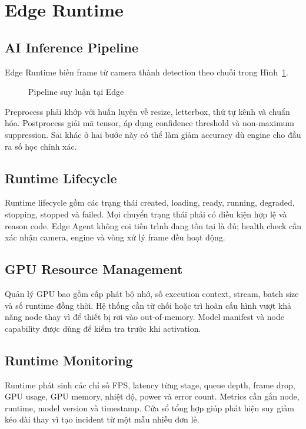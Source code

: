 \section{Edge Runtime}

\subsection{AI Inference Pipeline}

Edge Runtime biến frame từ camera thành detection theo chuỗi trong
Hình~\ref{fig:inference-pipeline-theory}.

\begin{figure}[H]
\centering
{}
\caption{Pipeline suy luận tại Edge}
\label{fig:inference-pipeline-theory}
\end{figure}

Preprocess phải khớp với huấn luyện về resize, letterbox, thứ tự kênh và chuẩn
hóa. Postprocess giải mã tensor, áp dụng confidence threshold và non-maximum
suppression. Sai khác ở hai bước này có thể làm giảm accuracy dù engine cho đầu
ra số học chính xác.

\subsection{Runtime Lifecycle}

Runtime lifecycle gồm các trạng thái created, loading, ready, running, degraded,
stopping, stopped và failed. Mọi chuyển trạng thái phải có điều kiện hợp lệ và
reason code. Edge Agent không coi tiến trình đang tồn tại là đủ; health check cần
xác nhận camera, engine và vòng xử lý frame đều hoạt động.

\subsection{GPU Resource Management}

Quản lý GPU bao gồm cấp phát bộ nhớ, số execution context, stream, batch size và
số runtime đồng thời. Hệ thống cần từ chối hoặc trì hoãn cấu hình vượt khả năng
node thay vì để thiết bị rơi vào out-of-memory. Model manifest và node capability
được dùng để kiểm tra trước khi activation.

\subsection{Runtime Monitoring}

Runtime phát sinh các chỉ số FPS, latency từng stage, queue depth, frame drop,
GPU usage, GPU memory, nhiệt độ, power và error count. Metrics cần gắn node,
runtime, model version và timestamp. Cửa sổ tổng hợp giúp phát hiện suy giảm kéo
dài thay vì tạo incident từ một mẫu nhiễu đơn lẻ.